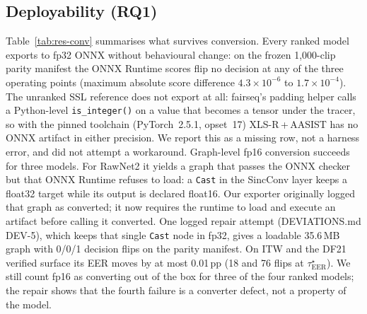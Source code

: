 \documentclass[journal]{IEEEtran}
\newcommand{\eer}{\mathrm{EER}}
\newcommand{\taustar}{\tau^{\star}}
\begin{document}
\subsection{Deployability (RQ1)}
\label{sec:res-deploy}
Table~\ref{tab:res-conv} summarises what survives conversion. Every ranked
model exports to fp32 ONNX without behavioural change: on the frozen
1,000-clip parity manifest the ONNX Runtime scores flip no decision at any of
the three operating points (maximum absolute score difference
\(4.3{\times}10^{-6}\) to \(1.7{\times}10^{-4}\)). The unranked SSL reference
does not export at all: fairseq's padding helper calls a Python-level
\texttt{is\_integer()} on a value that becomes a tensor under the tracer, so
with the pinned toolchain (PyTorch~2.5.1, opset~17) XLS-R\,+\,AASIST has no
ONNX artifact in either precision. We report this as a missing row, not a
harness error, and did not attempt a workaround. Graph-level fp16 conversion
succeeds for three models. For RawNet2 it yields a graph that passes the ONNX
checker but that ONNX Runtime refuses to load: a \texttt{Cast} in the SincConv
layer keeps a float32 target while its output is declared float16. Our
exporter originally logged that graph as converted; it now requires the
runtime to load and execute an artifact before calling it converted.
One logged repair attempt (DEVIATIONS.md DEV-5), which keeps that single
\texttt{Cast} node in fp32, gives a loadable 35.6\,MB graph with 0/0/1
decision flips on the parity manifest. On ITW and the DF21 verified surface its
EER moves by at most 0.01\,pp (18 and 76 flips at \(\taustar_{\eer}\)).
We still count fp16 as converting out of the box for three of the four ranked
models; the repair shows that the fourth failure is a converter defect, not a
property of the model.
\end{document}
